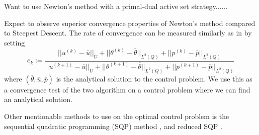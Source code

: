 Want to use Newton's method with a primal-dual active set strategy...... 


Expect to observe superior convergence properties of Newton's method compared to Steepest Descent. The rate of convergence can be measured similarly as in \cite{DPSteel} by setting 
\begin{equation}
    \label{eq:rate_of_conv}
    e_k := \frac{||u^{(k)}-\bar{u}||_U + ||\theta^{(k)}-\bar{\theta}||_{L^2(Q)} +||p^{(k)}-\bar{p}||_{L^2(Q)} }{||u^{(k+1)}-\bar{u}||_U + ||\theta^{(k+1)}-\bar{\theta}||_{L^2(Q)} +||p^{(k+1)}-\bar{p}||_{L^2(Q)}}
\end{equation}
where $(\bar{\theta},\bar{u},\bar{p})$ is the analytical solution to the control problem. We use this as a convergence test of the two algorithm on a control problem where we can find an analytical solution. 

Other mentionable methods to use on the optimal control problem is the sequential quadratic programming (SQP) method \cite{Algorithms}, and reduced SQP \cite{DPSteel}. 
